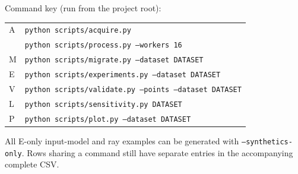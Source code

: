 \documentclass[10pt]{article}
\begin{document}
Command key (run from the project root):
\begin{center}\begin{tabular}{ll}
A & \texttt{python scripts/acquire.py}\\
  & \texttt{python scripts/process.py --workers 16}\\
M & \texttt{python scripts/migrate.py --dataset DATASET}\\
E & \texttt{python scripts/experiments.py --dataset DATASET}\\
V & \texttt{python scripts/validate.py --points --dataset DATASET}\\
L & \texttt{python scripts/sensitivity.py DATASET}\\
P & \texttt{python scripts/plot.py --dataset DATASET}\\
\end{tabular}\end{center}
 All E-only input-model and
ray examples can be generated with \texttt{--synthetics-only}. Rows sharing
a command still have separate entries in the accompanying complete CSV.
\small
\end{document}
